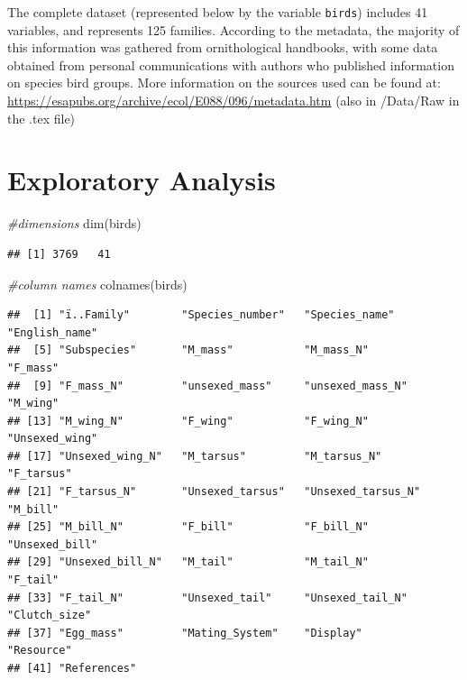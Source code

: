 \documentclass[
  12pt,
]{article}
\newenvironment{Shaded}{\begin{snugshade}}{\end{snugshade}}
\newcommand{\CommentTok}[1]{\textcolor[rgb]{0.56,0.35,0.01}{\textit{#1}}}
\newcommand{\FunctionTok}[1]{\textcolor[rgb]{0.00,0.00,0.00}{#1}}
\newcommand{\NormalTok}[1]{#1}
\begin{document}
The complete dataset (represented below by the variable \texttt{birds})
includes 41 variables, and represents 125 families. According to the
metadata, the majority of this information was gathered from
ornithological handbooks, with some data obtained from personal
communications with authors who published information on species bird
groups. More information on the sources used can be found at:
\url{https://esapubs.org/archive/ecol/E088/096/metadata.htm} (also in
/Data/Raw in the .tex file)

\newpage

\hypertarget{exploratory-analysis}{%
\section{Exploratory Analysis}\label{exploratory-analysis}}

\begin{Shaded}
\begin{Highlighting}[]
\CommentTok{\#dimensions}
\FunctionTok{dim}\NormalTok{(birds)}
\end{Highlighting}
\end{Shaded}

\begin{verbatim}
## [1] 3769   41
\end{verbatim}

\begin{Shaded}
\begin{Highlighting}[]
\CommentTok{\#column names}
\FunctionTok{colnames}\NormalTok{(birds)}
\end{Highlighting}
\end{Shaded}

\begin{verbatim}
##  [1] "ï..Family"        "Species_number"   "Species_name"     "English_name"    
##  [5] "Subspecies"       "M_mass"           "M_mass_N"         "F_mass"          
##  [9] "F_mass_N"         "unsexed_mass"     "unsexed_mass_N"   "M_wing"          
## [13] "M_wing_N"         "F_wing"           "F_wing_N"         "Unsexed_wing"    
## [17] "Unsexed_wing_N"   "M_tarsus"         "M_tarsus_N"       "F_tarsus"        
## [21] "F_tarsus_N"       "Unsexed_tarsus"   "Unsexed_tarsus_N" "M_bill"          
## [25] "M_bill_N"         "F_bill"           "F_bill_N"         "Unsexed_bill"    
## [29] "Unsexed_bill_N"   "M_tail"           "M_tail_N"         "F_tail"          
## [33] "F_tail_N"         "Unsexed_tail"     "Unsexed_tail_N"   "Clutch_size"     
## [37] "Egg_mass"         "Mating_System"    "Display"          "Resource"        
## [41] "References"
\end{verbatim}
\end{document}
